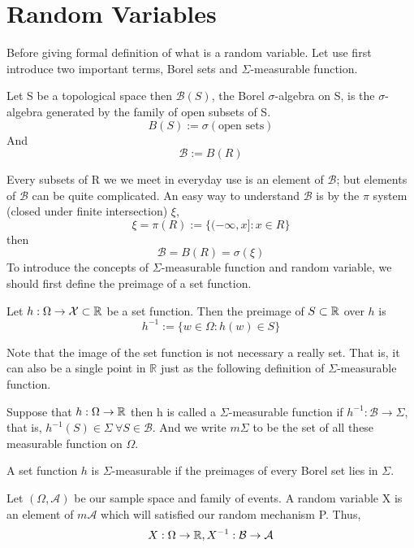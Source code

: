 \documentclass[Probability_Theory.tex]{subfiles}
\begin{document}
\section{Random Variables}
Before giving formal definition of what is a random variable. Let use first introduce two important terms, Borel sets and $\Sigma$-measurable function.
\begin{definition}
Let S be a topological space then $\mathcal{B}(S)$, the Borel $\sigma$-algebra on S, is the $\sigma$-algebra generated by the family of open subsets of S. $$B(S):=\sigma(\text{open sets})$$
And $$\mathcal{B}:=B(R)$$
\end{definition}
Every subsets of R we we meet in everyday use is an element of $\mathcal{B}$; but elements of $\mathcal{B}$ can be quite complicated. An easy way to understand $\mathcal{B}$ is by the $\pi$ system (closed under finite intersection) $\xi$, $$\xi=\pi(R):=\{(-\infty,x]:x\in R\}$$ then $$\mathcal{B}=B(R)=\sigma(\xi)$$
To introduce the concepts of $\Sigma$-measurable function and random variable, we should first define the preimage of a set function.
\begin{definition}
	Let $h:\Omega\rightarrow\mathcal{X}\subset{\mathbb R}$ be a set function. Then the preimage of $S\subset{\mathbb R}$ over $h$ is
	$$h^{-1}:=\{w\in\Omega:h(w)\in S \}$$
\end{definition}
Note that the image of the set function is not necessary a really set. That is, it can also be a single point in $\mathbb{R}$ just as the following definition of $\Sigma$-measurable function.
\begin{definition}
Suppose that $h:\Omega\rightarrow{\mathbb R}$ then h is called a $\Sigma$-measurable function if $h^{-1}:\mathcal{B}\rightarrow\Sigma$, that is, $h^{-1}(S)\in \Sigma\ \forall S\in\mathcal{B}.$
And we write $m\Sigma$ to be the set of all these measurable function on $\Omega$.
\end{definition} 
\begin{intuition}
	A set function $h$ is $\Sigma$-measurable if the preimages of every Borel set lies in $\Sigma$.
\end{intuition} 
\begin{definition}
Let $(\Omega,\mathcal{A})$ be our sample space and family of events. A random variable X  is an element of $m\mathcal{A}$ which will satisfied our random mechanism P. Thus,
$$X:\Omega\rightarrow{\mathbb R}, X^{-1}:\mathcal{B}\rightarrow\mathcal{A}$$
\end{definition}
\end{document}
